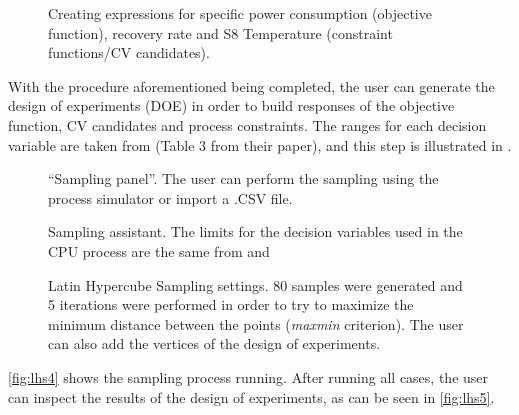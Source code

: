 \documentclass[../../msc-thesis.tex]{subfiles}
\begin{document}
\begin{figure}[htb]
    \centering
    \caption{Creating expressions for specific power consumption (objective 
    function), \co recovery rate and S8 Temperature 
    (constraint functions/CV candidates).}
    \label{fig:expreval}
\end{figure}

With the procedure aforementioned being completed, the user can generate 
the design of experiments (DOE) in order to build \kriging responses of the 
objective function, CV candidates and process constraints. The ranges for 
each decision variable are taken from \textcite{Jin2015} (Table 3 from their
paper), and this step is illustrated in .


\begin{figure}[htb]
    \centering
    \caption{\mtc ``Sampling panel''. The user can perform the 
    sampling using the process simulator or import a .CSV file.}
    \label{fig:lhs1}
\end{figure}

\begin{figure}[htb]
    \centering
    \caption{\mtc Sampling assistant. The limits for the 
    decision variables used in the CPU process are the same from 
    \textcite{Jin2015} and \textcite{Liu2019}}
    \label{fig:lhs2}
\end{figure}

\begin{figure}[htb]
    \centering
    \caption{\mtc Latin Hypercube Sampling settings. 80 
    samples were generated and 5 iterations were performed in order to try 
    to maximize the minimum distance between the points (\textit{maxmin} 
    criterion). The user can also add the vertices of the design of 
    experiments.}
    \label{fig:lhs3}
\end{figure}

\autoref{fig:lhs4} shows the sampling process running. After running all 
cases, the user can inspect the results of the design of experiments, as 
can be seen in \autoref{fig:lhs5}.
	
\end{document}
